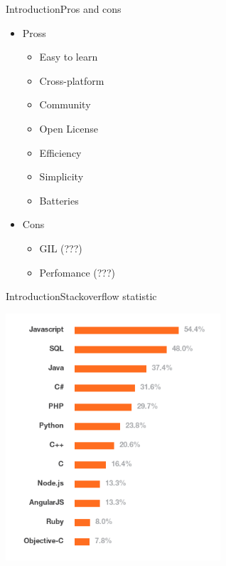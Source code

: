 \documentclass[10pt]{beamer}
\begin{document}
\begin{frame}{Introduction}{Pros and cons}
	\begin{itemize}
		\item Pross
		\begin{itemize}
			\item Easy to learn
			\item Cross-platform
			\item Community
			\item Open License
			\item Efficiency
			\item Simplicity
			\item Batteries
		\end{itemize}
		
		
		\item Cons
		\begin{itemize}
			\item GIL (???)
			\item Perfomance (???)
		\end{itemize}
		
	\end{itemize}	
\end{frame}


\begin{frame}{Introduction}{Stackoverflow statistic}
	\begin{center}
		\includegraphics[width=0.6\textwidth]{pictures/stackoverflow.jpg}
	\end{center}
\end{frame}
\end{document}
